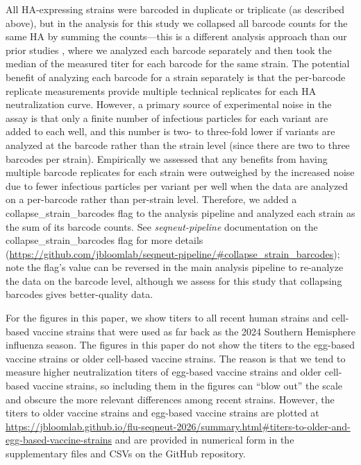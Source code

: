 All HA-expressing strains were barcoded in duplicate or triplicate (as described above), but in the analysis for this study we collapsed all barcode counts for the same HA by summing the counts---this is a different analysis approach than our prior studies \citep{kikawa2025,kikawa2026a,kikawa2026b,loes2024}, where we analyzed each barcode separately and then took the median of the measured titer for each barcode for the same strain. The potential benefit of analyzing each barcode for a strain separately is that the per-barcode replicate measurements provide multiple technical replicates for each HA neutralization curve. However, a primary source of experimental noise in the assay is that only a finite number of infectious particles for each variant are added to each well, and this number is two- to three-fold lower if variants are analyzed at the barcode rather than the strain level (since there are two to three barcodes per strain). Empirically we assessed that any benefits from having multiple barcode replicates for each strain were outweighed by the increased noise due to fewer infectious particles per variant per well when the data are analyzed on a per-barcode rather than per-strain level. Therefore, we added a collapse\_strain\_barcodes flag to the analysis pipeline and analyzed each strain as the sum of its barcode counts. See \emph{seqneut-pipeline} documentation on the collapse\_strain\_barcodes flag for more details (\href{https://github.com/jbloomlab/seqneut-pipeline/\#collapse_strain_barcodes}{https://github.com/jbloomlab/seqneut-pipeline/\#collapse\_strain\_barcodes}); note the flag's value can be reversed in the main analysis pipeline to re-analyze the data on the barcode level, although we assess for this study that collapsing barcodes gives better-quality data.

For the figures in this paper, we show titers to all recent human strains and cell-based vaccine strains that were used as far back as the 2024 Southern Hemisphere influenza season. The figures in this paper do not show the titers to the egg-based vaccine strains or older cell-based vaccine strains. The reason is that we tend to measure higher neutralization titers of egg-based vaccine strains \citep{kikawa2026b} and older cell-based vaccine strains, so including them in the figures can ``blow out'' the scale and obscure the more relevant differences among recent strains. However, the titers to older vaccine strains and egg-based vaccine strains are plotted at \href{https://jbloomlab.github.io/flu-seqneut-2026/summary.html\#titers-to-older-and-egg-based-vaccine-strains}{https://jbloomlab.github.io/flu-seqneut-2026/summary.html\#titers-to-older-and-egg-based-vaccine-strains} and are provided in numerical form in the supplementary files and CSVs on the GitHub repository.

